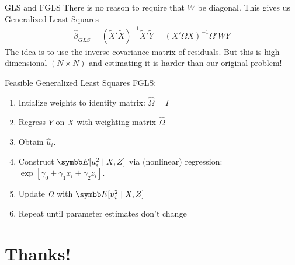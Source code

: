 \documentclass[aspectratio=169,11pt]{beamer}
\begin{document}
\begin{frame}{GLS and FGLS}
There is no reason to require that $W$ be diagonal. This gives us \alert{Generalized Least Squares}
\begin{align*}
\widehat{\beta}_{GLS} = (\tilde{X}'\tilde{X})^{-1}\tilde{X}'\tilde{Y} = (X' \Omega  X)^{-1} \Omega' W Y
\end{align*}
The idea is to use the \alert{inverse covariance matrix} of residuals. But this is high dimensional $(N \times N)$ and estimating it is harder than our original problem!

 Feasible Generalized Least Squares \alert{FGLS}:
\begin{enumerate}
\item Intialize weights to identity matrix: $\widehat{\Omega}= I$
\item Regress $Y$ on $X$ with weighting matrix $\widehat{\Omega}$
\item Obtain $\widehat{u}_i$.
\item Construct $\E[ u_i^2 \mid X, Z]$ via (nonlinear) regression: $\exp[ \gamma_0 + \gamma_1 x_{i} + \gamma_2 z_{i}]$.
\item Update $\widehat{\Omega}$ with $\E[ u_i^2 \mid X, Z]$
\item Repeat until parameter estimates don't change
\end{enumerate}
\end{frame}


\section*{Thanks!}
\end{document}
